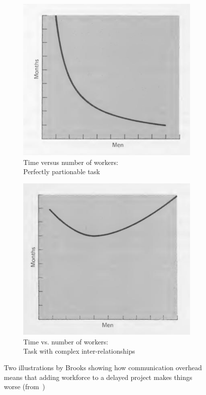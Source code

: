 \documentclass[runningheads]{llncs}
\begin{document}
\begin{figure}[t]
\vspace{-0.5em}
\centering
\begin{subfigure}{0.49\textwidth}
  \centering
   \noindent
   \includegraphics[scale=0.3]{figures/mm1.png}
   \caption{Time versus number of workers:\\Perfectly partionable task}
   \label{fig:xx}
\end{subfigure}
\hfill
\begin{subfigure}{0.49\textwidth}
  \centering
   \noindent
   \includegraphics[scale=0.3]{figures/mm2.png}
   \caption{Time vs. number of workers:\\Task with complex inter-relationships}
   \label{fig:syy}
\end{subfigure}
\caption{Two illustrations by Brooks showing how communication overhead means that adding workforce to a delayed project makes things worse (from~\cite{brooks-1975-manmonth})}
\label{fig:mm}
\vspace{-0.5em}
\end{figure}
\end{document}
